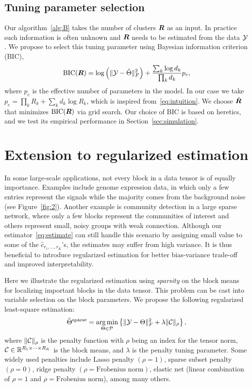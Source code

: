 \documentclass{article}
\begin{document}
\subsection{Tuning parameter selection}\label{sec:tuning}
Our algorithm~\ref{alg:B} takes the number of clusters $\bm{R}$ as an input. In practice such information is often unknown and $\bm{R}$ needs to be estimated from the data $\mathcal{Y}$. We propose to select this tuning parameter using Bayesian information criterion (BIC), 
\begin{equation}\label{eq:BIC}
\text{BIC}(\bm{R}) =  \log\left(\lVert\mathcal{Y}-\hat \Theta\rVert_F^2\right)+{ \sum_k \log d_k \over \prod_k d_k}p_e,
\end{equation}
where $p_e$ is the effective number of parameters in the model. In our case we take $p_e=\prod_k R_k+\sum_k d_k\log R_k$, which is inspired from~\eqref{eq:intuition}. We choose $\hat {\bm{R}}$ that minimizes $\text{BIC}(\bm{R})$ via grid search. Our choice of BIC is based on heretics, and we test its empirical performance in Section~\ref{sec:simulation}.  

\section{Extension to regularized estimation}
In some large-scale applications, not every block in a data tensor is of equally importance. Examples include genome expression data, in which only a few entries represent the signals while the majority comes from the background noise (see Figure~\ref{fig:2}). Another example is community detection in a large sparse network, where only a few blocks represent the communities of interest and others represent small, noisy groups with weak connection.  Although our estimator~\eqref{eq:estimate} can still handle this scenario by assigning small value to some of the $\hat c_{r_1,\ldots,r_K}$'s, the estimates may suffer from high variance. It is thus beneficial to introduce regularized estimation for better bias-variance trade-off and improved interpretability. 

Here we illustrate the regularized estimation using \emph{sparsity} on the block means for localizing important blocks in the data tensor. This problem can be cast into variable selection on the block parameters. We propose the following regularized least-square estimation:
\[
\hat \Theta^{\text{sparse}}=\operatorname*{arg\,min}_{\Theta\in \mathcal{P}}\left\{\lVert\mathcal{Y}-\Theta\rVert_F^2+\lambda \lVert\mathcal{C}\rVert_\rho
\right\},
\]
where $\lVert\mathcal{C}\rVert_\rho$ is the penalty function with $\rho$ being an index for the tensor norm, $\mathcal{C}\in\mathbb{R}^{R_1\times \cdots\times R_K}$ is the block means, and $\lambda$ is the penalty tuning parameter. Some widely used penalties include Lasso penalty $(\rho=1)$, sparse subset penalty $(\rho=0)$, ridge penalty $(\rho=\text{Frobenius norm})$, elastic net (linear combination of $\rho=1$ and $\rho=\text{Frobenius norm}$), among many others. 
\end{document}
